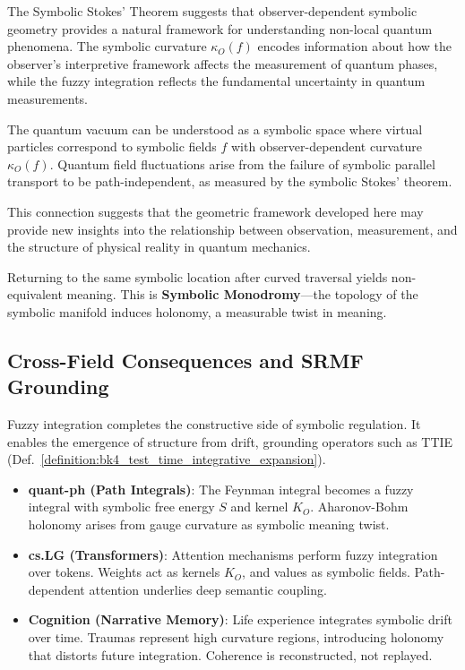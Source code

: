 The Symbolic Stokes' Theorem suggests that observer-dependent symbolic geometry provides a natural framework for understanding non-local quantum phenomena. The symbolic curvature $\kappa_O(f)$ encodes information about how the observer's interpretive framework affects the measurement of quantum phases, while the fuzzy integration reflects the fundamental uncertainty in quantum measurements.

\begin{proposition}
\label{prop:bk_4_quantum_geometry}
The quantum vacuum can be understood as a symbolic space where virtual particles correspond to symbolic fields $f$ with observer-dependent curvature $\kappa_O(f)$. Quantum field fluctuations arise from the failure of symbolic parallel transport to be path-independent, as measured by the symbolic Stokes' theorem.
\end{proposition}

This connection suggests that the geometric framework developed here may provide new insights into the relationship between observation, measurement, and the structure of physical reality in quantum mechanics.

\begin{scholium}
\label{schlium:bk4_symbolic_monodromy}
Returning to the same symbolic location after curved traversal yields non-equivalent meaning. This is \textbf{Symbolic Monodromy}—the topology of the symbolic manifold induces holonomy, a measurable twist in meaning.
\end{scholium}

\subsection{Cross-Field Consequences and SRMF Grounding}
\label{subsec:bk4_fuzzy_integration_applications}

Fuzzy integration completes the constructive side of symbolic regulation. It enables the emergence of structure from drift, grounding operators such as TTIE (Def.~\ref{definition:bk4_test_time_integrative_expansion}).

\begin{itemize}
    \item \textbf{quant-ph (Path Integrals)}: The Feynman integral becomes a fuzzy integral with symbolic free energy $S$ and kernel $K_O$. Aharonov-Bohm holonomy arises from gauge curvature as symbolic meaning twist.

    \item \textbf{cs.LG (Transformers)}: Attention mechanisms perform fuzzy integration over tokens. Weights act as kernels $K_O$, and values as symbolic fields. Path-dependent attention underlies deep semantic coupling.

    \item \textbf{Cognition (Narrative Memory)}: Life experience integrates symbolic drift over time. Traumas represent high curvature regions, introducing holonomy that distorts future integration. Coherence is reconstructed, not replayed.
\end{itemize}

